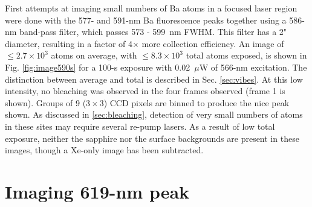 First attempts at imaging small numbers of Ba atoms in a focused laser region were done with the 577- and 591-nm Ba fluorescence peaks together using a 586-nm band-pass filter, which passes 573 - 599~nm FWHM.  This filter has a 2" diameter, resulting in a factor of 4$\times$ more collection efficiency.  An image of $\leq 2.7 \times 10^{3}$ atoms on average, with $\leq 8.3 \times 10^{3}$ total atoms exposed, is shown in Fig. \ref{fig:image590s} for a 100-s exposure with 0.02~$\mu$W of 566-nm excitation.  The distinction between average and total is described in Sec. \ref{sec:vibes}.  At this low intensity, no bleaching was observed in the four frames observed (frame 1 is shown).  Groups of 9 ($3 \times 3$) CCD pixels are binned to produce the nice peak shown.  As discussed in \ref{sec:bleaching}, detection of very small numbers of atoms in these sites may require several re-pump lasers.  As a result of low total exposure, neither the sapphire nor the surface backgrounds are present in these images, though a Xe-only image has been subtracted. 




\section{Imaging 619-nm peak}
\label{sec:imaging619}

